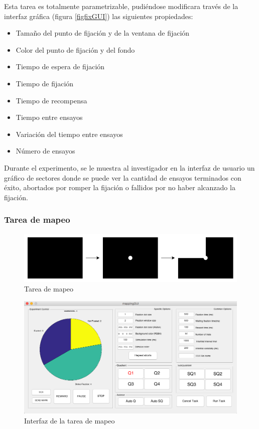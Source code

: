 \documentclass[conference]{IEEEtran}
\begin{document}
Esta tarea es totalmente parametrizable, pudiéndose modificara través de la interfaz gráfica (figura \ref{figfixGUI}) las siguientes propiedades:
\begin{itemize}
	\item Tamaño del punto de fijación y de la ventana de fijación
	\item Color del punto de fijación y del fondo
	\item Tiempo de espera de fijación
	\item Tiempo de fijación
	\item Tiempo de recompensa
	\item Tiempo entre ensayos
	\item Variación del tiempo entre ensayos
	\item Número de ensayos
\end{itemize}




Durante el experimento, se le muestra al investigador en la interfaz de usuario un gráfico de sectores donde se puede ver la cantidad de ensayos terminados con éxito, abortados por romper la fijación o fallidos por no haber alcanzado la fijación.

\subsubsection*{Tarea de mapeo}

\begin{figure}[htbp]
\centerline{\includegraphics[width=\linewidth]{figures/mapping_task}}
\caption{Tarea de mapeo}
\label{figMapTask}
\end{figure}

\begin{figure}[htbp]
\centerline{\includegraphics[width=\linewidth]{figures/mapping_gui}}
\caption{Interfaz de la tarea de mapeo}
\label{figmappingGUI}
\end{figure}
\end{document}
